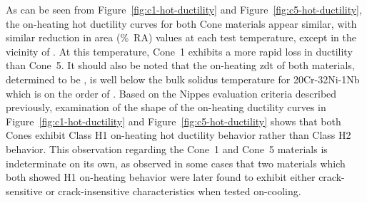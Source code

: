{As can be seen from Figure~\ref{fig:c1-hot-ductility} and Figure~\ref{fig:c5-hot-ductility}, the on-heating hot ductility curves for both Cone materials appear similar, with similar reduction in area (\%~RA) values at each test temperature, except in the vicinity of .  At this temperature, Cone~1 exhibits a more rapid loss in ductility than Cone~5.  It should also be noted that the on-heating \gls{zdt} of both materials, determined to be , is well below the bulk solidus temperature for 20Cr-32Ni-1Nb which is on the order of  \cite{hoffman_high_2000-1}. Based on the Nippes evaluation criteria \cite{nippes_further_1957} described previously, examination of the shape of the on-heating ductility curves in Figure~\ref{fig:c1-hot-ductility} and Figure~\ref{fig:c5-hot-ductility} shows that both Cones exhibit Class H1 on-heating hot ductility behavior rather than Class H2 behavior.  This observation regarding the Cone~1 and Cone~5 materials is indeterminate on its own, as \citet{nippes_further_1957} observed in some cases that two materials which both showed H1 on-heating behavior were later found to exhibit either crack-sensitive or crack-insensitive characteristics when tested on-cooling.

}
